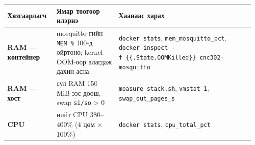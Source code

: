\begingroup\scriptsize\begin{longtable}[]{@{}lll@{}}
\toprule
\begin{minipage}[b]{0.30\columnwidth}\raggedright
Хязгаарлагч\strut
\end{minipage} & \begin{minipage}[b]{0.30\columnwidth}\raggedright
Ямар тоогоор илэрнэ\strut
\end{minipage} & \begin{minipage}[b]{0.30\columnwidth}\raggedright
Хаанаас харах\strut
\end{minipage}\tabularnewline
\midrule
\endhead
\begin{minipage}[t]{0.30\columnwidth}\raggedright
\textbf{RAM --- контейнер}\strut
\end{minipage} & \begin{minipage}[t]{0.30\columnwidth}\raggedright
mosquitto-гийн \texttt{MEM\ \%} 100-д ойртоно; kernel OOM-оор алагдаж дахин асна\strut
\end{minipage} & \begin{minipage}[t]{0.30\columnwidth}\raggedright
\texttt{docker\ stats}, \texttt{mem\_\allowbreak{}mosquitto\_\allowbreak{}pct}, \texttt{docker\ inspect\ -f\ \textquotesingle{}\{\{.State.OOMKilled\}\}\textquotesingle{}\ cnc302-mosquitto}\strut
\end{minipage}\tabularnewline
\begin{minipage}[t]{0.30\columnwidth}\raggedright
\textbf{RAM --- хост}\strut
\end{minipage} & \begin{minipage}[t]{0.30\columnwidth}\raggedright
сул RAM 150 MiB-ээс доош, swap \texttt{si/so} \textgreater{} 0\strut
\end{minipage} & \begin{minipage}[t]{0.30\columnwidth}\raggedright
\texttt{measure\_\allowbreak{}stack.\allowbreak{}sh}, \texttt{vmstat\ 1}, \texttt{swap\_\allowbreak{}out\_\allowbreak{}pages\_\allowbreak{}s}\strut
\end{minipage}\tabularnewline
\begin{minipage}[t]{0.30\columnwidth}\raggedright
\textbf{CPU}\strut
\end{minipage} & \begin{minipage}[t]{0.30\columnwidth}\raggedright
нийт CPU 380--400\% (4 цөм × 100\%)\strut
\end{minipage} & \begin{minipage}[t]{0.30\columnwidth}\raggedright
\texttt{docker\ stats}, \texttt{cpu\_\allowbreak{}total\_\allowbreak{}pct}\strut

\end{minipage}
\end{longtable}
